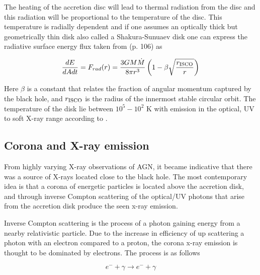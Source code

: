 



The heating of the accretion disc will lead to thermal radiation from the disc and this radiation will be
proportional to the temperature of the disc. This temperature is radially dependent and if one assumes an optically thick but geometrically thin disk also called a Shakura-Sunuaev disk
one can express the radiative surface energy flux taken from \cite{BHradiation}(p. 106) as 

\begin{equation}
    \frac{dE}{dAdt}= F_{rad}(r) = \frac{3GM\dot{M}}{8\pi r^3}\left(1-\beta\sqrt{\frac{r_{\rm ISCO}}{r}}\right)
\end{equation}

Here $\beta$ is a constant that relates the fraction of angular momentum captured by the black hole, and $r_{\rm ISCO}$ is the radius of the innermost stable circular orbit. 
The temperature of the disk lie between $10^5 - 10^2$ K with emission in the optical, UV to soft X-ray range according to \cite{scholarpedia_accretion_discs}.


\subsection{Corona and X-ray emission}
From highly varying X-ray observations of AGN, it became indicative that there was a source of X-rays located close to the black hole. 
The most contemporary idea is that a corona of energetic particles is located above the accretion disk, and through inverse Compton scattering
of the optical/UV photons that arise from the accretion disk produce the seen x-ray emission. 

Inverse Compton scattering is the process of a photon gaining energy from a nearby relativistic particle. Due to the increase in efficiency 
of up scattering a photon with an electron compared to a proton, the corona x-ray emission is thought to be dominated by electrons. The process is as follows

\begin{equation}
    e^- + \gamma \rightarrow e^- + \gamma 
\end{equation}





